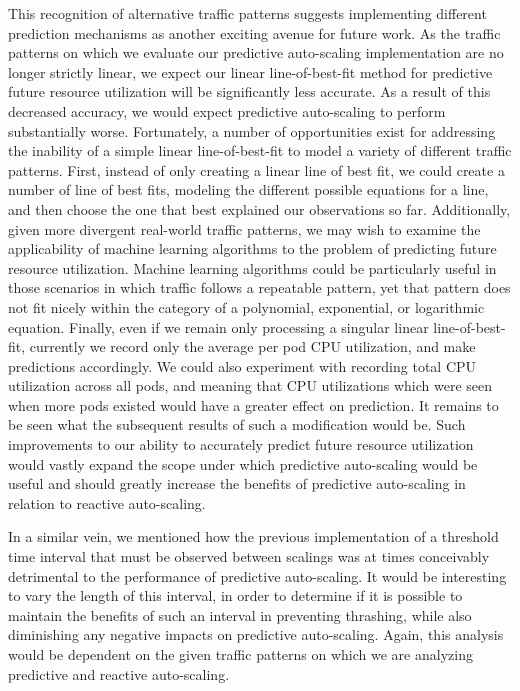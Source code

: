 This recognition of alternative traffic patterns suggests implementing
different prediction mechanisms as another exciting avenue for future work. As
the traffic patterns on which we evaluate our predictive auto-scaling
implementation are no longer strictly linear, we expect our linear
line-of-best-fit method for predictive future resource utilization will be
significantly less accurate. As a result of this decreased accuracy, we would
expect predictive auto-scaling to perform substantially worse. Fortunately, a
number of opportunities exist for addressing the inability of a simple linear
line-of-best-fit to model a variety of different traffic patterns.
First, instead of only creating a linear line of best fit, we could
create a number of line of best fits, modeling the different possible equations
for a line, and then choose the one that best explained our observations so far.
Additionally, given more divergent real-world traffic patterns, we may wish to
examine the applicability of machine learning algorithms to the problem of
predicting future resource utilization. Machine learning algorithms could be
particularly useful in those scenarios in which traffic follows a repeatable
pattern, yet that pattern does not fit nicely within the category of a
polynomial, exponential, or logarithmic equation. Finally, even if we remain
only processing a singular linear line-of-best-fit, currently we record only the
average per pod CPU utilization, and make predictions accordingly. We could also
experiment with recording total CPU utilization across all pods, and meaning
that CPU utilizations which were seen when more pods existed would have a
greater effect on prediction. It remains to be seen what the subsequent results
of such a modification would be. Such improvements to our
ability to accurately predict future resource utilization
would vastly expand the scope under which predictive auto-scaling would be
useful and should greatly increase the benefits of predictive auto-scaling in
relation to reactive auto-scaling.

In a similar vein, we mentioned how the previous implementation of a threshold time
interval that must be observed between scalings was at times conceivably
detrimental to the performance of predictive auto-scaling.
It would be interesting to vary the length of this interval, in
order to determine if it is possible to maintain the benefits of such an
interval in preventing
thrashing, while also diminishing any negative impacts on predictive
auto-scaling. Again, this analysis would be dependent on the given traffic
patterns on which we are analyzing predictive and reactive auto-scaling.

